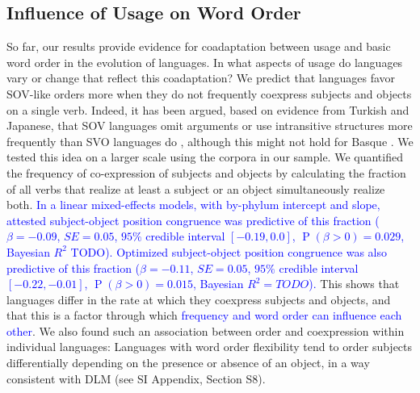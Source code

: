 \documentclass[9pt,twocolumn,twoside,lineno]{pnas-new}
\begin{document}
\subsection*{Influence of Usage on Word Order}
So far, our results provide evidence for coadaptation between usage and basic word order in the evolution of languages.
In what aspects of usage do languages vary or change that reflect this coadaptation?
We predict that languages favor SOV-like orders more when they do not frequently coexpress subjects and objects on a single verb.
Indeed, it has been argued, based on evidence from Turkish and Japanese, that SOV languages omit arguments or use intransitive structures more frequently than SVO languages do \citep{hiranuma1999syntactic,ueno2009does,luk2014investigating}, although this might not hold for Basque \citep{pastor2013processing}.
We tested this idea on a larger scale using the corpora in our sample.
We quantified the frequency of co-expression of subjects and objects by calculating the fraction of all verbs that realize at least a subject or an object simultaneously realize both.
\textcolor{blue}{In a linear mixed-effects models, with by-phylum intercept and slope, attested subject-object position congruence was predictive of this fraction ($\beta=-0.09$, $SE=0.05$, $95\%$ credible interval $[-0.19, 0.0]$, $\operatorname{P}(\beta>0) = 0.029$, Bayesian $R^2$ TODO).} %
\textcolor{blue}{Optimized subject-object position congruence was also predictive of this fraction ($\beta=-0.11$, $SE=0.05$, $95\%$ credible interval $[-0.22,  -0.01]$, $\operatorname{P}(\beta>0) = 0.015$, Bayesian $R^2=TODO$).} %
This shows that languages differ in the rate at which they coexpress subjects and objects, and that this is a factor through which \textcolor{blue}{frequency and word order can influence each other}.
We also found such an association between order and coexpression within individual languages: Languages with word order flexibility tend to order subjects differentially depending on the presence or absence of an object, in a way consistent with DLM (see SI Appendix, Section S8).



\end{document}
